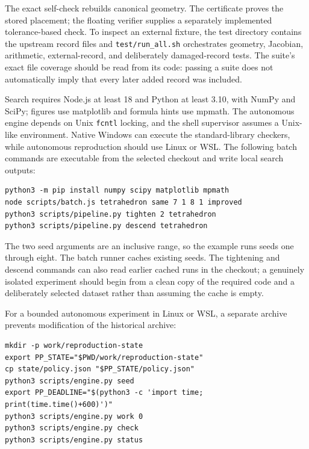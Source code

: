 \documentclass[11pt,a4paper]{article}
\begin{document}
The exact self-check rebuilds canonical geometry. The certificate proves the stored placement; the floating verifier supplies a separately implemented tolerance-based check. To inspect an external fixture, the test directory contains the upstream record files and \nolinkurl{test/run_all.sh} orchestrates geometry, Jacobian, arithmetic, external-record, and deliberately damaged-record tests. The suite's exact file coverage should be read from its code: passing a suite does not automatically imply that every later added record was included.

Search requires Node.js at least 18 and Python at least 3.10, with NumPy and SciPy; figures use matplotlib and formula hints use mpmath. The autonomous engine depends on Unix \nolinkurl{fcntl} locking, and the shell supervisor assumes a Unix-like environment. Native Windows can execute the standard-library checkers, while autonomous reproduction should use Linux or WSL. The following batch commands are executable from the selected checkout and write local search outputs:

\begin{Verbatim}[fontsize=\footnotesize,breaklines=true]
python3 -m pip install numpy scipy matplotlib mpmath
node scripts/batch.js tetrahedron same 7 1 8 1 improved
python3 scripts/pipeline.py tighten 2 tetrahedron
python3 scripts/pipeline.py descend tetrahedron
\end{Verbatim}

The two seed arguments are an inclusive range, so the example runs seeds one through eight. The batch runner caches existing seeds. The tightening and descend commands can also read earlier cached runs in the checkout; a genuinely isolated experiment should begin from a clean copy of the required code and a deliberately selected dataset rather than assuming the cache is empty.

For a bounded autonomous experiment in Linux or WSL, a separate archive prevents modification of the historical archive:

\begin{Verbatim}[fontsize=\footnotesize,breaklines=true]
mkdir -p work/reproduction-state
export PP_STATE="$PWD/work/reproduction-state"
cp state/policy.json "$PP_STATE/policy.json"
python3 scripts/engine.py seed
export PP_DEADLINE="$(python3 -c 'import time; print(time.time()+600)')"
python3 scripts/engine.py work 0
python3 scripts/engine.py check
python3 scripts/engine.py status
\end{Verbatim}
\end{document}
